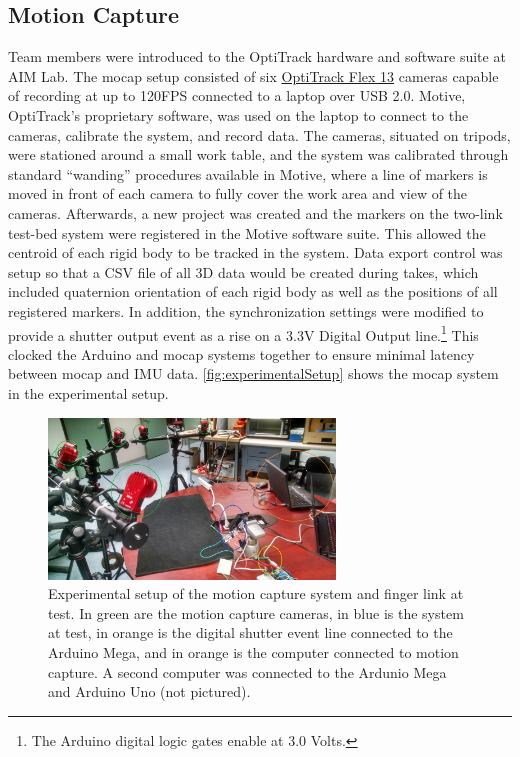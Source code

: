 \documentclass[letterpaper, 10 pt, conference]{ieeeconf}  %
\begin{document}
\subsection{Motion Capture}
Team members were introduced to the OptiTrack hardware and software suite at AIM Lab. The mocap setup consisted of six \href{http://optitrack.com/products/flex-13/}{OptiTrack Flex 13} cameras capable of recording at up to 120FPS connected to a laptop over USB 2.0. Motive, OptiTrack's proprietary software, was used on the laptop to connect to the cameras, calibrate the system, and record data. The cameras, situated on tripods, were stationed around a small work table, and the system was calibrated through standard ``wanding'' procedures available in Motive, where a line of markers is moved in front of each camera to fully cover the work area and view of the cameras. Afterwards, a new project was created and the markers on the two-link test-bed system were registered in the Motive software suite. This allowed the centroid of each rigid body to be tracked in the system. Data export control was setup so that a CSV file of all 3D data would be created during takes, which included quaternion orientation of each rigid body as well as the positions of all registered markers. In addition, the synchronization settings were modified to provide a shutter output event as a rise on a 3.3V Digital Output line.\footnote{The Arduino digital logic gates enable at 3.0 Volts.} This clocked the Arduino and mocap systems together to ensure minimal latency between mocap and IMU data. \autoref{fig:experimentalSetup} shows the mocap system in the experimental setup.

\begin{figure}[thpb]
	\centering
	\includegraphics[width = 3in]{experimental_setup.jpg}
    \caption{Experimental setup of the motion capture system and finger link at test. In green are the motion capture cameras, in blue is the system at test, in orange is the digital shutter event line connected to the Arduino Mega, and in orange is the computer connected to motion capture. A second computer was connected to the Ardunio Mega and Arduino Uno (not pictured).}
    \label{fig:experimentalSetup}
\end{figure}
\end{document}
